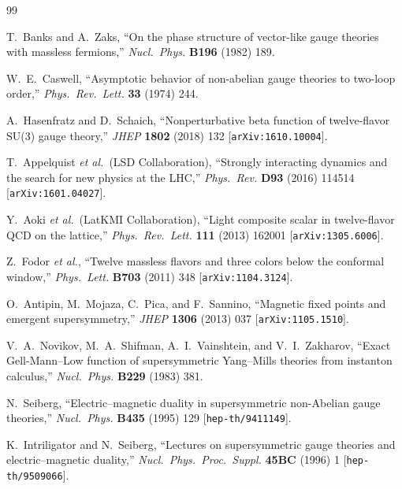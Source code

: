 \documentclass[11pt,a4paper]{article}
\theoremstyle{plain}
\theoremstyle{definition}
\theoremstyle{remark}
\begin{document}
\begin{thebibliography}{99}

  T.~Banks and A.~Zaks,
  ``On the phase structure of vector-like gauge theories with massless
  fermions,''
  \textit{Nucl.~Phys.} \textbf{B196} (1982) 189.

  W.~E.~Caswell,
  ``Asymptotic behavior of non-abelian gauge theories to two-loop
  order,''
  \textit{Phys.~Rev.~Lett.} \textbf{33} (1974) 244.

  A.~Hasenfratz and D.~Schaich,
  ``Nonperturbative beta function of twelve-flavor SU(3) gauge
  theory,''
  \textit{JHEP} \textbf{1802} (2018) 132
  [\texttt{arXiv:1610.10004}].

  T.~Appelquist \textit{et al.}\ (LSD Collaboration),
  ``Strongly interacting dynamics and the search for new physics at
  the LHC,''
  \textit{Phys.~Rev.} \textbf{D93} (2016) 114514
  [\texttt{arXiv:1601.04027}].

  Y.~Aoki \textit{et al.}\ (LatKMI Collaboration),
  ``Light composite scalar in twelve-flavor QCD on the lattice,''
  \textit{Phys.~Rev.~Lett.} \textbf{111} (2013) 162001
  [\texttt{arXiv:1305.6006}].

  Z.~Fodor \textit{et al.},
  ``Twelve massless flavors and three colors below the conformal
  window,''
  \textit{Phys.~Lett.} \textbf{B703} (2011) 348
  [\texttt{arXiv:1104.3124}].

  O.~Antipin, M.~Mojaza, C.~Pica, and F.~Sannino,
  ``Magnetic fixed points and emergent supersymmetry,''
  \textit{JHEP} \textbf{1306} (2013) 037
  [\texttt{arXiv:1105.1510}].

  V.~A.~Novikov, M.~A.~Shifman, A.~I.~Vainshtein, and
  V.~I.~Zakharov,
  ``Exact Gell-Mann--Low function of supersymmetric Yang--Mills
  theories from instanton calculus,''
  \textit{Nucl.~Phys.} \textbf{B229} (1983) 381.

  N.~Seiberg,
  ``Electric--magnetic duality in supersymmetric non-Abelian gauge
  theories,''
  \textit{Nucl.~Phys.} \textbf{B435} (1995) 129
  [\texttt{hep-th/9411149}].

  K.~Intriligator and N.~Seiberg,
  ``Lectures on supersymmetric gauge theories and electric--magnetic
  duality,''
  \textit{Nucl.~Phys.~Proc.~Suppl.} \textbf{45BC} (1996) 1
  [\texttt{hep-th/9509066}].


\end{thebibliography}
\end{document}
